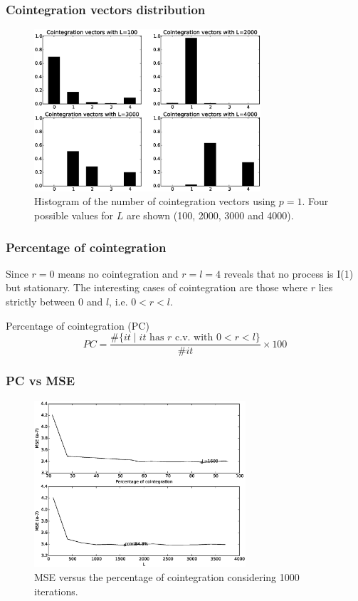 \documentclass[compress,red]{beamer}
\begin{document}
\begin{frame}
\frametitle{Cointegration vectors distribution}
\begin{figure}[!h]
  \centering
  \includegraphics[width=0.75\textwidth]{img/histCointVectors-offset20520-p-1-freq-10s}
  \caption{Histogram of the number of cointegration vectors using $p=1$. Four
  possible values for $L$ are shown (100, 2000, 3000 and 4000).}
  \label{fig:hists}
\end{figure}
\end{frame}

\begin{frame}
\frametitle{Percentage of cointegration}
Since $r=0$ means no cointegration and $r=l=4$ reveals that no process is I(1) but stationary.
The interesting cases of cointegration are those where $r$ lies strictly
between $0$ and $l$, i.e. $0<r<l$.
\begin{block}{Percentage of cointegration (PC)}
{\color{blue}
\begin{equation*} \label{eq:pcoint}
PC = 
\frac{\#\{ it \mid \text{$it$ has $r$ c.v. with $0<r<l$}\}}
     {\#it}\times 100
\end{equation*}}
\end{block}
\end{frame}


\begin{frame}
\frametitle{PC vs MSE}
\begin{figure}[ht!]
  \centering
  \includegraphics[width=0.7\textwidth]{img/MSE-offset20520-p-2-freq-10s}
  \caption{MSE versus the percentage of cointegration considering 1000
  iterations. }
  \label{fig:cointvsmse}
\end{figure}
\end{frame}
\end{document}
